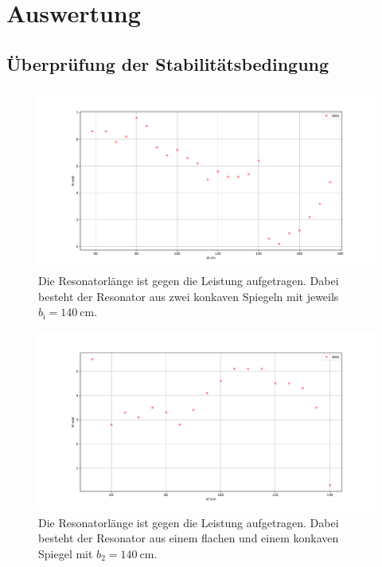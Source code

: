 \section{Auswertung}
\label{sec:Auswertung}

\subsection{Überprüfung der Stabilitätsbedingung}

\begin{figure}
    \centering
    \includegraphics[width=12cm]{plots/stability140.pdf}
    \caption{Die Resonatorlänge ist gegen die Leistung aufgetragen. Dabei besteht der Resonator aus zwei konkaven Spiegeln mit jeweils $b_\text{i} = \SI{140}{\centi\meter}$.}
    \label{fig:stability140}
\end{figure}   

\begin{figure}
    \centering
    \includegraphics[width=12cm]{plots/stability_flat.pdf}
    \caption{Die Resonatorlänge ist gegen die Leistung aufgetragen. Dabei besteht der Resonator aus einem flachen und einem konkaven Spiegel mit $b_2 = \SI{140}{\centi\meter}$.}
    \label{fig:stability_flat}
\end{figure} 

